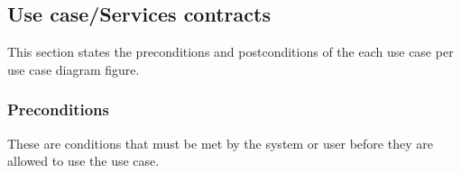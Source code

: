 \documentclass[12pt]{article}
\begin{document}
\vspace{0.2in}

\subsection{Use case/Services contracts} %
\vspace{0.2in}

This section states the preconditions and postconditions of the each use case per use case diagram figure. \\

\subsubsection{Preconditions}
These are conditions that must be met by the system or user before they are allowed to use the use case.\\
\end{document}
